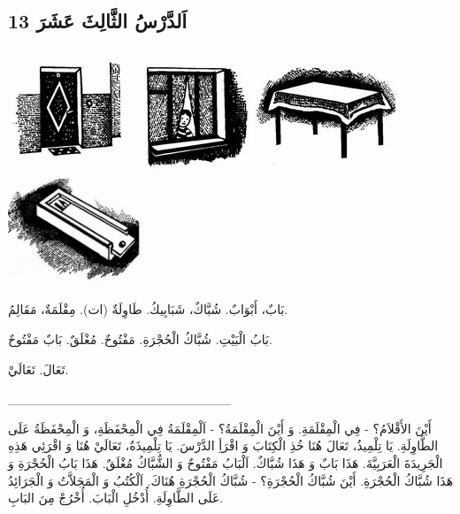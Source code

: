 \documentclass[a5paper]{article}
\begin{document}
\subsection{13 اَلدَّرْسُ الثَّالِثَ عَشَرَ}
 \includegraphics[width=1.4898in,height=1.4583in]{images/MuhammadBagauddinprettified-img022.jpg}   \includegraphics[width=1.3228in,height=1.448in]{images/MuhammadBagauddinprettified-img023.jpg}   \includegraphics[width=1.7083in,height=1.4689in]{images/MuhammadBagauddinprettified-img024.jpg}   \includegraphics[width=1.5874in,height=1.2508in]{images/MuhammadBagauddinprettified-img025.jpg} 

بَابٌ، أَبْوَابٌ. شُبَّاكٌ، شَبَابِيكُ. طَاوِلَةٌ (ات). مِقْلَمَةٌ، مَقَالِمُ.

بَابُ الْبَيْتِ. شُبَّاكُ الْحُجْرَةِ. مَفْتُوحٌ. مُغْلَقٌ. بَابٌ مَفْتُوحٌ.

تَعَالَ. تَعَالَيْ.

\_\_\_\_\_\_\_\_\_\_\_\_\_\_\_\_\_\_\_\_\_\_\_\_

أَيْنَ الأَقْلاَمُ؟ - فِي الْمِقْلَمَةِ. وَ أَيْنَ الْمِقْلَمَةُ؟ - اَلْمِقْلَمَةُ فِي الْمِحْفَظَةِ، وَ الْمِحْفَظَةُ عَلَى الطَّاوِلَةِ. يَا تِلْمِيذُ، تَعَالَ هُنَا خُذِ الْكِتَابَ وَ اقْرَأِ الدَّرْسَ. يَا تِلْمِيذَةُ، تَعَالَيْ هُنَا وَ اقْرَئِي هَذِهِ الْجَرِيدَةَ الْعَرَبِيَّةَ. هَذَا بَابٌ وَ هَذَا شُبَّاكٌ. اَلْبَابُ مَفْتُوحٌ وَ الشُّبَّاكُ مُغْلَقٌ. هَذَا بَابُ الْحُجْرَةِ وَ هَذَا شُبَّاكُ الْحُجْرَةِ. أَيْنَ شُبَّاكُ الْحُجْرَةِ؟ - شُبَّاكُ الْحُجْرَةِ هُنَاكَ. اَلْكُتُبُ وَ الْمَجَلاَّتُ وَ الْجَرَائِدُ عَلَى الطَّاوِلَةِ. أُدْخُلِ الْبَابَ. أُخْرُجْ مِنَ البَابِ.
\end{document}
